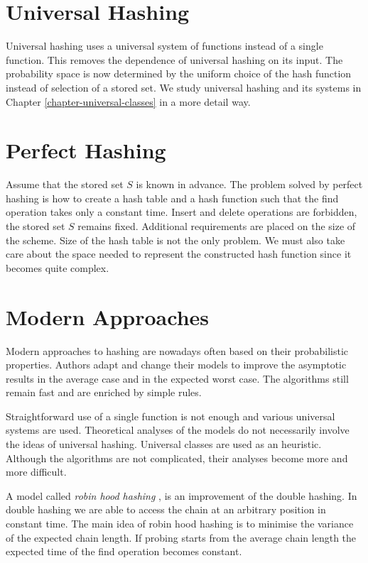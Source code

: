 \section{Universal Hashing}
Universal hashing uses a universal system of functions instead of a single function. This removes the dependence of universal hashing on its input. The probability space is now determined by the uniform choice of the hash function instead of selection of a stored set. We study universal hashing and its systems in Chapter \ref{chapter-universal-classes} in a more detail way.

\section{Perfect Hashing}
Assume that the stored set $S$ is known in advance. The problem solved by perfect hashing is how to create a hash table and a hash function such that the find operation takes only a constant time. Insert and delete operations are forbidden, the stored set $S$ remains fixed. Additional requirements are placed on the size of the scheme. Size of the hash table is not the only problem. We must also take care about the space needed to represent the constructed hash function since it becomes quite complex.

\section{Modern Approaches}
Modern approaches to hashing are nowadays often based on their probabilistic properties. Authors adapt and change their models to improve the asymptotic results in the average case and in the expected worst case. The algorithms still remain fast and are enriched by simple rules. 

Straightforward use of a single function is not enough and various universal systems are used. Theoretical analyses of the models do not necessarily involve the ideas of universal hashing. Universal classes are used as an heuristic. Although the algorithms are not complicated, their analyses become more and more difficult.

A model called \emph{robin hood hashing} \cite{10.1109/SFCS.1985.48}, \cite{Devroye04onworst} is an improvement of the double hashing. In double hashing we are able to access the chain at an arbitrary position in constant time. The main idea of robin hood hashing is to minimise the variance of the expected chain length. If probing starts from the average chain length the expected time of the find operation becomes constant.

